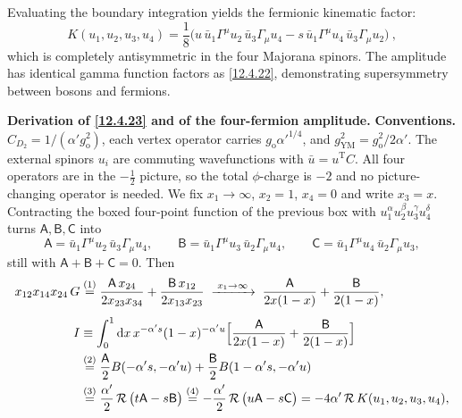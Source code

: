 \noindent Evaluating the boundary integration yields the fermionic kinematic factor:
\begin{equation}
	K(u_{1},u_{2},u_{3},u_{4}) = \frac{1}{8}\bigl(u\,\bar{u}_{1}\Gamma^{\mu}u_{2}\,\bar{u}_{3}\Gamma_{\mu}u_{4} - s\,\bar{u}_{1}\Gamma^{\mu}u_{4}\,\bar{u}_{3}\Gamma_{\mu}u_{2}\bigr) \:, \label{12.4.23}
\end{equation}
which is completely antisymmetric in the four Majorana spinors. The amplitude has identical gamma function factors as \eqref{12.4.22}, demonstrating supersymmetry between bosons and fermions.

\begin{tcolorbox}[breakable]
	\begin{remark}
		\textbf{Derivation of \eqref{12.4.23} and of the four-fermion amplitude.} \textbf{Conventions.} $C_{D_2}=1/(\alpha'g_{\mathrm{o}}^{2})$, each vertex operator carries $g_{\mathrm{o}}\alpha'^{1/4}$, and $g_{\mathrm{YM}}^{2}=g_{\mathrm{o}}^{2}/2\alpha'$. The external spinors $u_{i}$ are commuting wavefunctions with $\bar u=u^{\mathrm{T}}C$. All four operators are in the $-\frac12$ picture, so the total $\phi$-charge is $-2$ and no picture-changing operator is needed. We fix $x_{1}\to\infty$, $x_{2}=1$, $x_{4}=0$ and write $x_{3}=x$. Contracting the boxed four-point function of the previous box with $u_{1}^{\alpha}u_{2}^{\beta}u_{3}^{\gamma}u_{4}^{\delta}$ turns $\mathsf A,\mathsf B,\mathsf C$ into
		\[
		\mathsf A=\bar u_{1}\Gamma^{\mu}u_{2}\,\bar u_{3}\Gamma_{\mu}u_{4},\qquad \mathsf B=\bar u_{1}\Gamma^{\mu}u_{3}\,\bar u_{2}\Gamma_{\mu}u_{4},\qquad \mathsf C=\bar u_{1}\Gamma^{\mu}u_{4}\,\bar u_{2}\Gamma_{\mu}u_{3},
		\]
		still with $\mathsf A+\mathsf B+\mathsf C=0$. Then
		\begin{align*}
			x_{12}x_{14}x_{24}\,G
			&\overset{(1)}{=} \frac{\mathsf A\,x_{24}}{2x_{23}x_{34}}+\frac{\mathsf B\,x_{12}}{2x_{13}x_{23}}
			\;\xrightarrow{\;x_{1}\to\infty\;}\;\frac{\mathsf A}{2x(1-x)}+\frac{\mathsf B}{2(1-x)} ,\\[4pt]
			I&\equiv\int_{0}^{1}\mathrm{d} x\,x^{-\alpha's}(1-x)^{-\alpha'u}\Bigl[\frac{\mathsf A}{2x(1-x)}+\frac{\mathsf B}{2(1-x)}\Bigr]\\
			&\overset{(2)}{=} \frac{\mathsf A}{2}B(-\alpha's,-\alpha'u)+\frac{\mathsf B}{2}B(1-\alpha's,-\alpha'u)\\
			&\overset{(3)}{=} \frac{\alpha'}{2}\,\mathcal R\,\bigl(t\mathsf A-s\mathsf B\bigr)
			\overset{(4)}{=} -\frac{\alpha'}{2}\,\mathcal R\,\bigl(u\mathsf A-s\mathsf C\bigr)
			=-4\alpha'\,\mathcal R\,K(u_{1},u_{2},u_{3},u_{4}) ,
		\end{align*}

\end{remark}
\end{tcolorbox}
